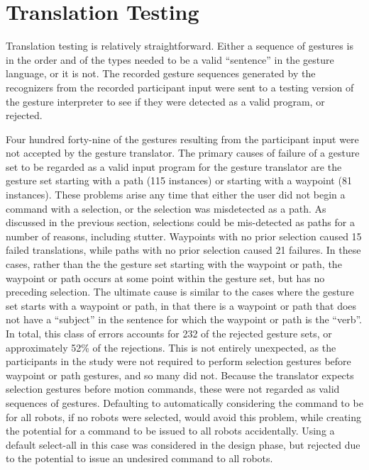 \section{Translation Testing}

Translation testing is relatively straightforward. 
Either a sequence of gestures is in the order and of the types needed to be a valid ``sentence'' in the gesture language, or it is not. 
The recorded gesture sequences generated by the recognizers from the recorded participant input were sent to a testing version of the gesture interpreter to see if they were detected as a valid program, or rejected. 

Four hundred forty-nine of the gestures resulting from the participant input were not accepted by the gesture translator. 
The primary causes of failure of a gesture set to be regarded as a valid input program for the gesture translator are the gesture set starting with a path (115 instances) or starting with a waypoint (81 instances). 
These problems arise any time that either the user did not begin a command with a selection, or the selection was misdetected as a path. 
As discussed in the previous section, selections could be mis-detected as paths for a number of reasons, including stutter. 
Waypoints with no prior selection caused 15 failed translations, while paths with no prior selection caused 21 failures. 
In these cases, rather than the the gesture set starting with the waypoint or path, the waypoint or path occurs at some point within the gesture set, but has no preceding selection. 
The ultimate cause is similar to the cases where the gesture set starts with a waypoint or path, in that there is a waypoint or path that does not have a ``subject'' in the sentence for which the waypoint or path is the ``verb''.
In total, this class of errors accounts for 232 of the rejected gesture sets, or approximately 52\% of the rejections. 
This is not entirely unexpected, as the participants in the study were not required to perform selection gestures before waypoint or path gestures, and so many did not.
Because the translator expects selection gestures before motion commands, these were not regarded as valid sequences of gestures. 
Defaulting to automatically considering the command to be for all robots, if no robots were selected, would avoid this problem, while creating the potential for a command to be issued to all robots accidentally. 
Using a default select-all in this case was considered in the design phase, but rejected due to the potential to issue an undesired command to all robots. 

